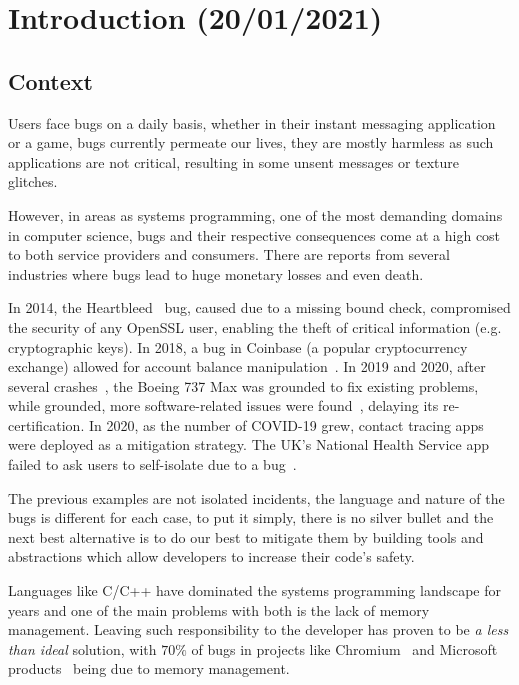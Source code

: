 \chapter{Introduction (20/01/2021)}\label{cha:introduction}

\section{Context}\label{sec:context}


Users face bugs on a daily basis, whether in their instant messaging application or a game,
bugs currently permeate our lives, they are mostly harmless as such applications are not critical,
resulting in some unsent messages or texture glitches.

However, in areas as systems programming, one of the most demanding domains in computer science,
bugs and their respective consequences come at a high cost to both service providers and consumers.
There are reports from several industries where bugs lead to huge monetary losses and even death.

In 2014, the Heartbleed~\autocite{Heartbleed} bug, caused due to a missing bound check,
compromised the security of any OpenSSL user, enabling the theft of critical information (e.g. cryptographic keys).
In 2018, a bug in Coinbase (a popular cryptocurrency exchange)
allowed for account balance manipulation~\autocite{Vicompany2018}.
In 2019 and 2020, after several crashes~\autocite{Campbell2019},
the Boeing 737 Max was grounded to fix existing problems, while grounded,
more software-related issues were
found~\autocite{Okane2019,Okane2020},
delaying its re-certification.
In 2020, as the number of COVID-19 grew,
contact tracing apps were deployed as a mitigation strategy.
The UK's National Health Service app failed to ask users to self-isolate due to a
bug~\autocite{Mageit2020}.

The previous examples are not isolated incidents, the language and nature of the bugs is different for each case,
to put it simply, there is no silver bullet and the next best alternative is to do our best to mitigate them by
building tools and abstractions which allow developers to increase their code's safety.

Languages like C/C++ have dominated the systems programming landscape for years and
one of the main problems with both is the lack of memory management.
Leaving such responsibility to the developer has proven to be \emph{a less than ideal}
solution, with $70\%$ of bugs in projects like Chromium~\autocite{chromium}
and Microsoft products~\autocite{Miller2019} being due to memory management.

